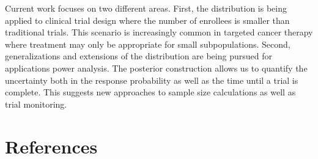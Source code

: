\documentclass[review]{elsarticle}
\begin{document}
Current work focuses on two different areas. First, the distribution
is being applied to clinical trial design
where the number of enrollees is smaller than traditional trials.
This scenario is increasingly common in targeted cancer
therapy where treatment may only be appropriate for small subpopulations.
Second, generalizations and extensions of the distribution are being pursued
for applications power analysis. The posterior construction allows us
to quantify the uncertainty both in the response probability as well as the
time until a trial is complete. This suggests new approaches to sample
size calculations as well as trial monitoring.

\section*{References}


\end{document}
